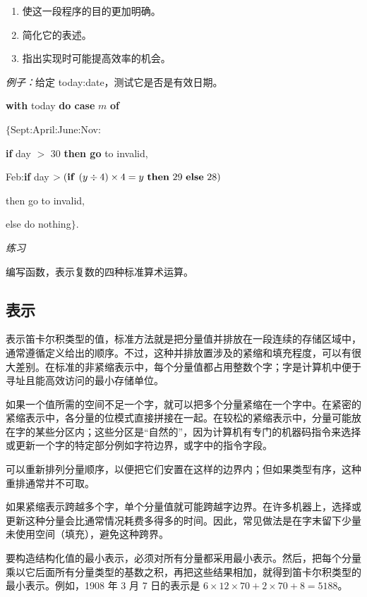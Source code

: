 \documentclass[twoside,11pt,fontset=none]{ctexbook}
\begin{document}
\begin{enumerate}[wide, nosep, label=(\arabic*)]
	\item 使这一段程序的目的更加明确。
	\item 简化它的表述。
	\item 指出实现时可能提高效率的机会。
\end{enumerate}

\noindent
\textit{例子：}给定 today:date，测试它是否是有效日期。

\quad \textbf{with} today \textbf{do case} $m$ \textbf{of}

\quad \quad $\{$Sept:April:June:Nov:

\quad \quad \quad \textbf{if} day $>$ 30 \textbf{then go} to invalid,

\quad \quad \quad Feb:\textbf{if} day $> (\text{\textbf{if }} (y \div 4) \times 4 = y \text{ \textbf{then} } 29 \text{ \textbf{else} } 28)$

\quad \quad \quad \quad then go to invalid,

\quad \quad \quad else do nothing$\}$.

\noindent
\textit{练习}
\nopagebreak

\noindent
编写函数，表示复数的四种标准算术运算。

\subsection{表示}
\label{sec:representation-4-2}

表示笛卡尔积类型的值，标准方法就是把分量值并排放在一段连续的存储区域中，通常遵循定义给出的顺序。不过，这种并排放置涉及的紧缩和填充程度，可以有很大差别。在标准的非紧缩表示中，每个分量值都占用整数个字；字是计算机中便于寻址且能高效访问的最小存储单位。

如果一个值所需的空间不足一个字，就可以把多个分量紧缩在一个字中。在紧密的紧缩表示中，各分量的位模式直接拼接在一起。在较松的紧缩表示中，分量可能放在字的某些分区内；这些分区是“自然的”，因为计算机有专门的机器码指令来选择或更新一个字的特定部分\textemdash{}例如字符边界，或字中的指令字段。

可以重新排列分量顺序，以便把它们安置在这样的边界内；但如果类型有序，这种重排通常并不可取。

如果紧缩表示跨越多个字，单个分量值就可能跨越字边界。在许多机器上，选择或更新这种分量会比通常情况耗费多得多的时间。因此，常见做法是在字末留下少量未使用空间（填充），避免这种跨界。

要构造结构化值的最小表示，必须对所有分量都采用最小表示。然后，把每个分量乘以它后面所有分量类型的基数之积，再把这些结果相加，就得到笛卡尔积类型的最小表示。例如，1908 年 3 月 7 日的表示是 $6\times 12\times 70 + 2\times 70 + 8 = 5188$。
\end{document}
